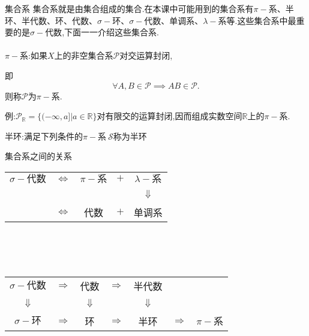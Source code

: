 \begin{frame}{集合系}
	集合系就是由集合组成的集合.在本课中可能用到的集合系有$\pi-\text{系}$、半环、半代数、环、代数、$\sigma-\text{环}$、$\sigma-\text{代数}$、单调系、$\lambda-\text{系}$等.这些集合系中最重要的是\alert{$\sigma-\text{代数}$},下面一一介绍这些集合系.
	\\ \hspace*{\fill} \\%
	\alert{$\pi-\text{系}$}:如果$X$上的非空集合系$\mathcal{P}$对交运算封闭,
	
	即\begin{equation}
		\forall A,B\in\mathcal{P} \implies AB\in\mathcal{P}.
	\end{equation} 
	则称$\mathcal{P}$为$\pi-\text{系}$.
	
	例:$\mathcal{P}_\mathbb{R} = \{(-\infty,a]|a\in\mathbb{R}  \}$对有限交的运算封闭,因而组成实数空间$\mathbb{R}$上的$\pi-\text{系}$.
\end{frame}

\begin{frame}
	\alert{半环}:满足下列条件的$\pi-\text{系}~\mathcal{S}$称为半环
\end{frame}

\begin{frame}{集合系之间的关系}
\Large
\begin{tabular}{ccccc}
	$\sigma-\text{代数}$ & $\Longleftrightarrow$ & $\pi-\text{系}$ & $+$ & $\lambda-\text{系}$ \\
	~ & ~ & ~ & ~ & $\Downarrow$ \\
	~  & $\Longleftrightarrow$ & 代数 & $+$ & 单调系 \\
\end{tabular}
\\ \hspace*{\fill} \\%
\hspace*{\fill} \\%
\begin{tabular}{ccccccc}
	$\sigma-\text{代数}$ & $\Longrightarrow$ & 代数 & $\Longrightarrow$ & 半代数 & ~ & ~ \\
	$\Downarrow$ & ~ & $\Downarrow$ & ~ & $\Downarrow$ & ~ & ~ \\
	$\sigma-\text{环}$ & $\Longrightarrow$ & 环 & $\Longrightarrow$ & 半环 & $\Longrightarrow$ & $\pi-\text{系}$
\end{tabular}
\end{frame}

